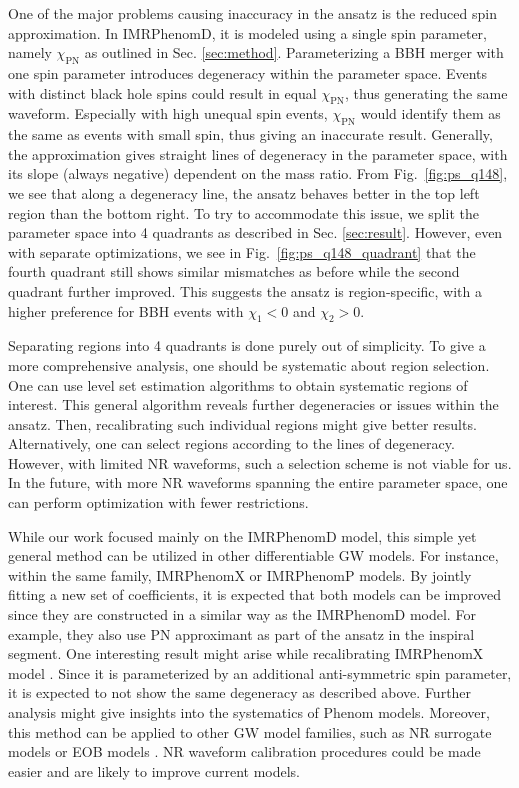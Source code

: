\documentclass[twocolumn]{aastex631}
\begin{document}
One of the major problems causing inaccuracy in the ansatz is the reduced spin approximation. In IMRPhenomD, it is modeled using a single spin parameter, namely $\chi_{\mathrm{PN}}$ as outlined in Sec. \ref{sec:method}. Parameterizing a BBH merger with one spin parameter introduces degeneracy within the parameter space. Events with distinct black hole spins could result in equal $\chi_{\mathrm{PN}}$, thus generating the same waveform. Especially with high unequal spin events, $\chi_{\mathrm{PN}}$ would identify them as the same as events with small spin, thus giving an inaccurate result. Generally, the approximation gives straight lines of degeneracy in the parameter space, with its slope (always negative) dependent on the mass ratio. From Fig.~\ref{fig:ps_q148}, we see that along a degeneracy line, the ansatz behaves better in the top left region than the bottom right. To try to accommodate this issue, we split the parameter space into 4 quadrants as described in Sec. \ref{sec:result}. However, even with separate optimizations, we see in Fig.~\ref{fig:ps_q148_quadrant} that the fourth quadrant still shows similar mismatches as before while the second quadrant further improved. This suggests the ansatz is region-specific, with a higher preference for BBH events with $\chi_1<0$ and $\chi_2>0$. 

Separating regions into 4 quadrants is done purely out of simplicity. To give a more comprehensive analysis, one should be systematic about region selection. One can use level set estimation algorithms to obtain systematic regions of interest. This general algorithm reveals further degeneracies or issues within the ansatz. Then, recalibrating such individual regions might give better results. Alternatively, one can select regions according to the lines of degeneracy. However, with limited NR waveforms, such a selection scheme is not viable for us. In the future, with more NR waveforms spanning the entire parameter space, one can perform optimization with fewer restrictions. 

While our work focused mainly on the IMRPhenomD model, this simple yet general method can be utilized in other differentiable GW models. For instance, within the same family, IMRPhenomX \citep{pratten2020setting} or IMRPhenomP \citep{hannam2014simple} models. By jointly fitting a new set of coefficients, it is expected that both models can be improved since they are constructed in a similar way as the IMRPhenomD model. For example, they also use PN approximant as part of the ansatz in the inspiral segment. One interesting result might arise while recalibrating IMRPhenomX model \citep{pratten2020setting}. Since it is parameterized by an additional anti-symmetric spin parameter, it is expected to not show the same degeneracy as described above. Further analysis might give insights into the systematics of Phenom models. Moreover, this method can be applied to other GW model families, such as NR surrogate models \citep{varma2019surrogate} or EOB models \citep{taracchini2014effective}. NR waveform calibration procedures could be made easier and are likely to improve current models.
\end{document}
